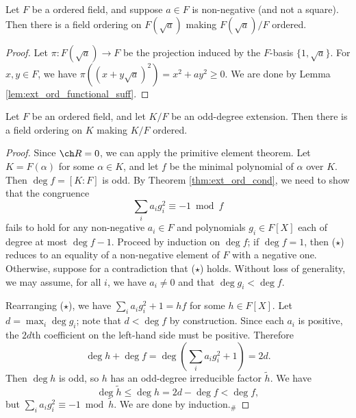 \begin{corollary}
  \label{cor:ext_ord_to_adj_sqrt}
  \leanok
  Let $F$ be a ordered field, and suppose $a\in F$ is non-negative (and not a square). Then there is a field ordering on $F(\sqrt{a})$ making $F(\sqrt{a})/F$ ordered.
\end{corollary}
\begin{proof}
  \leanok
  Let $\pi:F(\sqrt{a})\to F$ be the projection induced by the $F$-basis $\{1,\sqrt{a}\}$. For $x,y\in F$, we have $\pi((x+y\sqrt{a})^2)=x^2+ay^2\geq0$. We are done by Lemma \ref{lem:ext_ord_functional_suff}.
\end{proof}

\begin{lemma}
  \label{lem:ext_ord_odd_deg}
  \leanok
  Let $F$ be an ordered field, and let $K/F$ be an odd-degree extension. Then there is a field ordering on $K$ making $K/F$ ordered.
\end{lemma}
\begin{proof}
  \leanok
  Since $\ch R=0$, we can apply the primitive element theorem. Let $K=F(\alpha)$ for some $\alpha\in K$, and let $f$ be the minimal polynomial of $\alpha$ over $K$. Then $\deg f=[K:F]$ is odd. By Theorem \ref{thm:ext_ord_cond}, we need to show that the congruence
  \[\sum_ia_ig_i^2\equiv-1\bmod f\tag{$\star$}\]
  fails to hold for any non-negative $a_i\in F$ and polynomials $g_i\in F[X]$ each of degree at most $\deg f-1$. Proceed by induction on $\deg f$; if $\deg f=1$, then ($\star$) reduces to an equality of a non-negative element of $F$ with a negative one. Otherwise, suppose for a contradiction that ($\star$) holds. Without loss of generality, we may assume, for all $i$, we have $a_i\neq0$ and that $\deg g_i<\deg f$.
  
  Rearranging ($\star$), we have $\sum_ia_ig_i^2+1=hf$ for some $h\in F[X]$. Let $d=\max_i\deg g_i$; note that $d<\deg f$ by construction. Since each $a_i$ is positive, the $2d$th coefficient on the left-hand side must be positive. Therefore
  \[\deg h+\deg f=\deg\left(\sum_ia_ig_i^2+1\right)=2d.\]
  Then $\deg h$ is odd, so $h$ has an odd-degree irreducible factor $\tilde h$. We have
  \[\deg\tilde h\leq\deg h=2d-\deg f<\deg f,\]
  but $\sum_ia_ig_i^2\equiv-1\bmod\tilde h$. We are done by induction.$_\#$
\end{proof}

